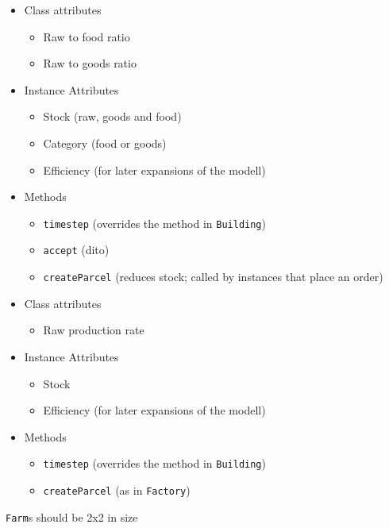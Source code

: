 \begin{frame}[fragile]
%
\begin{tcbraster}[raster columns=2,
                  raster equal height,
                  nobeforeafter,
                  raster column skip=0.5cm]
\begin{tcolorbox}[title=Class \texttt{Factory}]
\begin{itemize}
\item Class attributes
	\begin{itemize}
	\item Raw to food ratio
	\item Raw to goods ratio
	\end{itemize}
\item Instance Attributes
	\begin{itemize}
	\item Stock (raw, goods and food)
	\item Category (food or goods)
	\item Efficiency (for later expansions of the modell)
	\end{itemize}
\item Methods
	\begin{itemize}
	\item \texttt{timestep} (overrides the method in \texttt{Building})
	\item \texttt{accept} (dito)
	\item \texttt{createParcel} (reduces stock; called by instances that place an order)
	\end{itemize}
\end{itemize}
\end{tcolorbox}
%
\begin{tcolorbox}[title=Class \texttt{Farm}]
\begin{itemize}
\item Class attributes
	\begin{itemize}
	\item Raw production rate
	\end{itemize}
\item Instance Attributes
	\begin{itemize}
	\item Stock
	\item Efficiency (for later expansions of the modell)
	\end{itemize}
\item Methods
	\begin{itemize}
	\item \texttt{timestep} (overrides the method in \texttt{Building})
	\item \texttt{createParcel} (as in \texttt{Factory})
	\end{itemize}
\end{itemize}
\texttt{Farm}s should be 2x2 in size
\end{tcolorbox}
\end{tcbraster}
%
\end{frame}


